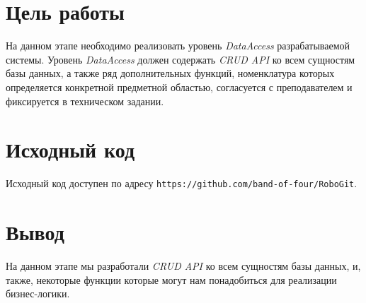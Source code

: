 \documentclass[listings]{labreport}
\begin{document}
\maketitlepage

\section*{Цель работы}

На данном этапе необходимо реализовать уровень \textit{DataAccess} 
разрабатываемой системы. Уровень \textit{DataAccess} должен содержать 
\textit{CRUD API} ко всем сущностям 
базы данных, а также ряд дополнительных функций, номенклатура которых 
определяется конкретной предметной областью, согласуется с преподавателем 
и фиксируется в техническом задании.

\section*{Исходный код}

Исходный код доступен по адресу 
\texttt{https://github.com/band-of-four/RoboGit}.

\section*{Вывод}

На данном этапе мы разработали \textit{CRUD API} ко всем сущностям базы данных,
и, также, некоторые функции которые могут нам понадобиться для реализации
бизнес-логики.
\end{document}
